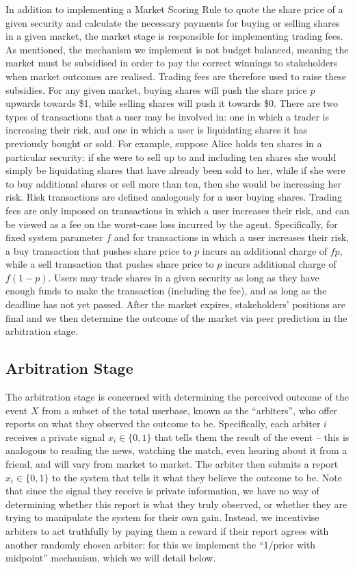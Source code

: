 In addition to implementing a Market Scoring Rule to quote the share price of a
given security and calculate the necessary payments for buying or selling
shares in a given market, the market stage is responsible for implementing
trading fees. As mentioned, the mechanism we implement is not budget balanced,
meaning the market must be subsidised in order to pay the correct winnings to
stakeholders when market outcomes are realised. Trading fees are therefore used
to raise these subsidies. For any given market, buying shares will push the
share price $p$ upwards towards \$1, while selling shares will push it towards
\$0. There are two types of transactions that a user may be involved in: one in
which a trader is increasing their risk, and one in which a user is liquidating
shares it has previously bought or sold. For example, suppose Alice holds ten
shares in a particular security: if she were to sell up to and including ten
shares she would simply be liquidating shares that have already been sold to
her, while if she were to buy additional shares or sell more than ten, then she
would be increasing her risk. Risk transactions are defined analogously for a
user buying shares. Trading fees are only imposed on transactions in which a
user increases their risk, and can be viewed as a fee on the worst-case loss
incurred by the agent. Specifically, for fixed system parameter $f$ and for
transactions in which a user increases their risk, a buy transaction that
pushes share price to $p$ incurs an additional charge of $fp$, while a sell
transaction that pushes share price to $p$ incurs additional charge of
$f(1-p)$. Users may trade shares in a given security as long as they have
enough funds to make the transaction (including the fee), and as long as the
deadline has not yet passed. After the market expires, stakeholders' positions
are final and we then determine the outcome of the market via peer prediction
in the arbitration stage.

\subsection{Arbitration Stage}

The arbitration stage is concerned with determining the perceived outcome
of the event $X$ from a subset of the total userbase, known as the
``arbiters'', who offer reports on what they observed the outcome to be.
Specifically, each arbiter $i$ receives a private signal $x_i \in \{0,1\}$ that
tells them the result of the event -- this is analogous to reading the news,
watching the match, even hearing about it from a friend, and will vary from
market to market. The arbiter then submits a report $\hat{x}_i \in \{0,1\}$ to
the system that tells it what they believe the outcome to be. Note that since
the signal they receive is private information, we have no way of determining
whether this report is what they truly observed, or whether they are trying to
manipulate the system for their own gain. Instead, we incentivise arbiters to
act truthfully by paying them a reward if their report agrees with another
randomly chosen arbiter: for this we implement the ``1/prior with midpoint''
mechanism, which we will detail below.

